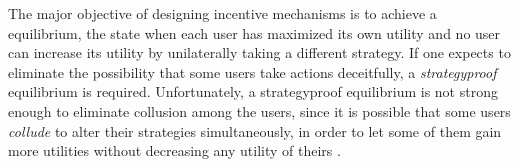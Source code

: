 \documentclass[conference]{IEEEtran}
\theoremstyle{definition}
\begin{document}
{\color{black}
The major objective of designing incentive mechanisms is to achieve a equilibrium, the state when each user has maximized its own utility and no user can increase its utility by unilaterally taking a different strategy. If one expects to eliminate the possibility that some users take actions deceitfully, a \emph{strategyproof} equilibrium is required. %
Unfortunately, a strategyproof equilibrium is not strong enough to eliminate collusion among the users, since it is possible that some users \emph{collude} to alter their strategies simultaneously, in order to let some of them gain more utilities without decreasing any utility of theirs \cite{zhong2007designing}. 


}
\end{document}

